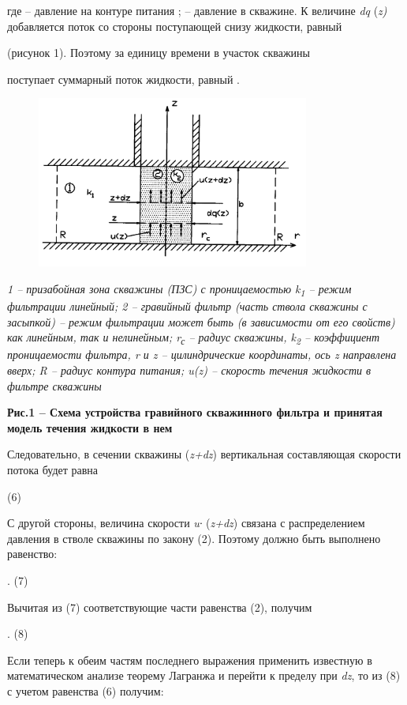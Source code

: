 где
--
давление на контуре питания
;
--
давление в скважине. К величине \emph{dq} (\emph{z)} добавляется поток
со стороны поступающей снизу жидкости, равный

(рисунок 1). Поэтому за единицу времени в участок скважины

поступает суммарный поток жидкости, равный
.


\begin{figure}[H]
	\centering
	\includegraphics[width=0.8\textwidth]{media/gorn/image17}
	\caption*{}
\end{figure}


\emph{1 -- призабойная зона скважины (ПЗС) с проницаемостью
k\textsubscript{1} -- режим фильтрации линейный; 2 -- гравийный фильтр
(часть ствола скважины с засыпкой) -- режим фильтрации может быть (в
зависимости от его свойств) как линейным, так и нелинейным;
r\textsubscript{с} -- радиус скважины, k\textsubscript{2} -- коэффициент
проницаемости фильтра, r и z -- цилиндрические координаты, ось z
направлена вверх; R -- радиус контура питания; u(z) -- скорость течения
жидкости в фильтре скважины}

{\bfseries Рис.1 -- Схема устройства гравийного скважинного фильтра и
принятая модель течения жидкости в нем}

Следовательно, в сечении скважины (\emph{z+dz}) вертикальная
составляющая скорости потока будет равна

(6)

С другой стороны, величина скорости \emph{u∙} (\emph{z+dz}) связана с
распределением давления в стволе скважины по закону (2). Поэтому должно
быть выполнено равенство:

.
(7)

Вычитая из (7) соответствующие части равенства (2), получим

.
(8)

Если теперь к обеим частям последнего выражения применить известную в
математическом анализе теорему Лагранжа и перейти к пределу при
\emph{dz},
то из (8) с учетом равенства (6) получим:

